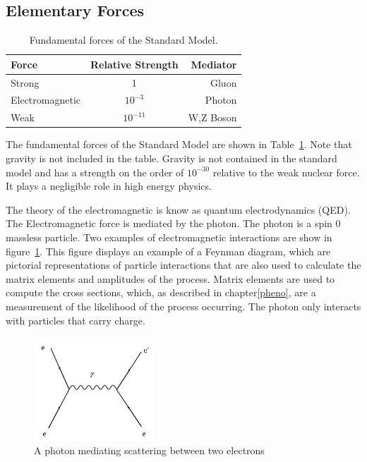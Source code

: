 \documentclass[oneside, letterpaper, oldfontcommands]{memoir}
\begin{document}
\subsection{Elementary Forces}\label{elemforces}

\begin{table}[htbp]
  \centering
  \begin{tabular}{ | l | c | r |}
    \hline
    Force & Relative Strength & Mediator \\ \hline \hline
    Strong & 1 & Gluon \\ \hline
    Electromagnetic & $10^{-3}$ & Photon \\ \hline
    Weak & $10 ^{-11}$ & W,Z Boson \\ \hline
    
  \end{tabular}
  \caption{Fundamental forces of the Standard Model\cite{Halzen:1984mc}.}
  \label{tab:FundForces}
\end{table}

\qquad The fundamental forces of the Standard Model are shown in Table~\ref{tab:FundForces}. Note that gravity is not included in the table. Gravity is not contained in the standard model and has a strength on the order of $10^{-30}$ \cite{Barger:0201058766} relative to the weak nuclear force. It plays a negligible role in high energy physics.

\qquad The theory of the electromagnetic is know as quantum electrodynamics (QED). The Electromagnetic force is mediated by the photon. The photon is a spin 0 massless particle. Two examples of electromagnetic interactions are show in figure~\ref{fig:eeScattering}. This figure displays an example of a Feynman diagram, which are pictorial representations of particle interactions that are also used to calculate the matrix elements and amplitudes of the process. Matrix elements are used to compute the cross sections, which, as described in chapter\ref{pheno}, are a measurement of the likelihood of the process occurring. The photon only interacts with particles that carry charge. 

\begin{figure}[here]
\includegraphics[width=0.4\textwidth]{eeScattering.jpg}
\caption{A photon mediating scattering between two electrons}
\label{fig:eeScattering}
\end{figure}
\end{document}
